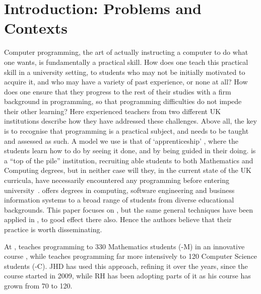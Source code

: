 \documentclass[conference,compsoc]{IEEEtran}
\begin{document}




%
\IEEEpeerreviewmaketitle



\section{Introduction: Problems and Contexts}
Computer programming, the art of actually instructing a computer to do
what one wants, is fundamentally a practical skill. How does one teach
this practical skill in a university setting, to students who may not
be initially motivated to acquire it, and who may have a variety of
past experience, or none at all? How does one ensure that they
progress to the rest of their studies with a firm background in
programming, so that programming difficulties do not impede their
other learning? Here experienced teachers from two different
UK institutions describe how they have addressed these
challenges. Above all, the key is to recognise that programming is a
practical subject, and needs to be taught and assessed as such. A
model we use is that of `apprenticeship' \cite{Viha}, where the
students learn how to do by seeing it done, and by being guided in
their doing. \Bath{} is a ``top of the pile'' institution, recruiting
able students to both Mathematics and Computing degrees, but in
neither case will they, in the current state of the UK curricula,
have necessarily encountered any programming before entering
university~\cite{brown-et-al-sigcse2013}. \Cardiff{} offers degrees in
computing, software engineering and business information systems to a
broad range of students from diverse educational backgrounds. This
paper focuses on \Bath{}, but the same general techniques have been
applied in \Cardiff{}, to good effect there also. Hence the authors
believe that their practice is worth disseminating.

At \Bath, \JHD{} teaches programming to 330 Mathematics students
(\Bath-M) in an innovative course \cite{XX}, while \RH{} teaches
programming far more intensively to 120 Computer Science students
(\Bath-C). JHD has used this approach, refining it over the years,
since the course started in 2009, while RH has been adopting parts of
it as his course has grown from 70 to 120.
\end{document}
